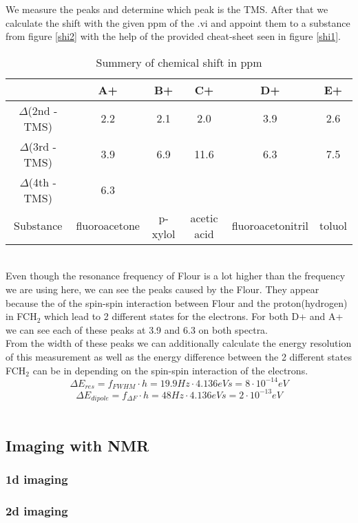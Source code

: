We measure the peaks and determine which peak is the TMS. After that we calculate the shift with the given ppm of the .vi and appoint them to a substance from figure \ref{shi2} with the help of the provided cheat-sheet seen in figure \ref{shi1}. \\
\begin{table}[h!]
\centering
\begin{tabular}{c||c|c|c|c|c}
 & A+ & B+ & C+ & D+ & E+ \\
\hline
\hline
$\Delta$(2nd - TMS) & 2.2 & 2.1 & 2.0 & 3.9 & 2.6 \\
\hline
$\Delta$(3rd - TMS) & 3.9 & 6.9 & 11.6 & 6.3 & 7.5 \\
\hline
$\Delta$(4th - TMS) & 6.3 &  &  &  & \\
\hline
\hline
Substance & fluoroacetone & p-xylol & acetic acid & fluoroacetonitril & toluol \\
\end{tabular}
\caption{Summery of chemical shift in ppm}
\label{table2}
\end{table}\\
Even though the resonance frequency of Flour is a lot higher than the frequency we are using here, we can see the peaks caused by the Flour. They appear because the of the spin-spin interaction between Flour and the proton(hydrogen) in FCH$_2$ which lead to 2 different states for the electrons. For both D+ and A+ we can see each of these peaks at 3.9 and 6.3 on both spectra.
\vspace{2mm}\\
From the width of these peaks we can additionally calculate the energy resolution of this measurement as well as the energy difference between the 2 different states FCH$_2$ can be in depending on the spin-spin interaction of the electrons.
\begin{equation}\label{E_r}
	\Delta E_{res} = f_{FWHM} \cdot h = 19.9 Hz \cdot 4.136eVs = 8 \cdot 10^{-14}eV
\end{equation}
\begin{equation}\label{E_d}
	\Delta E_{dipole} = f_{\Delta F} \cdot h = 48 Hz \cdot 4.136eVs = 2 \cdot 10^{-13}eV
\end{equation}\\
\subsection{Imaging with NMR}\label{imaging-with-nmr}

\subsubsection{1d imaging}\label{d-imaging}

\subsubsection{2d imaging}\label{d-imaging-1}